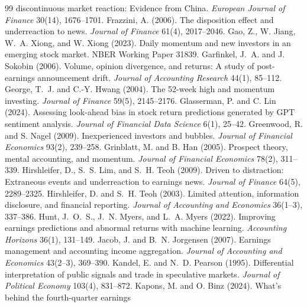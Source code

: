 \documentclass[10pt]{article}
\begin{document}
\begin{thebibliography}{99}
discontinuous market reaction: Evidence from China. \emph{European Journal of Finance} 30(14), 1676--1701.
 Frazzini, A. (2006). The disposition effect and underreaction to news.
\emph{Journal of Finance} 61(4), 2017--2046.
 Gao, Z., W. Jiang, W.~A. Xiong, and W. Xiong (2023). Daily momentum and new
investors in an emerging stock market. NBER Working Paper 31839.
 Garfinkel, J.~A. and J. Sokobin (2006). Volume, opinion
divergence, and returns: A study of post-earnings announcement drift. \emph{Journal of Accounting Research} 44(1),
85--112.
 George, T.~J. and C.-Y. Hwang (2004). The 52-week high and momentum
investing. \emph{Journal of Finance} 59(5), 2145--2176.
 Glasserman, P. and C. Lin (2024). Assessing look-ahead bias in
stock return predictions generated by GPT sentiment analysis. \emph{Journal of Financial Data Science} 6(1), 25--42.
 Greenwood, R. and S. Nagel (2009). Inexperienced investors and
bubbles. \emph{Journal of Financial Economics} 93(2), 239--258.
 Grinblatt, M. and B. Han (2005). Prospect theory, mental accounting,
and momentum. \emph{Journal of Financial Economics} 78(2), 311--339.
 Hirshleifer, D., S.~S. Lim, and S.~H. Teoh (2009). Driven to
distraction: Extraneous events and underreaction to earnings news. \emph{Journal of Finance} 64(5), 2289--2325.
 Hirshleifer, D. and S.~H. Teoh (2003). Limited attention,
information disclosure, and financial reporting. \emph{Journal of Accounting and Economics} 36(1--3), 337--386.
 Hunt, J.~O.~S., J.~N. Myers, and L.~A. Myers (2022). Improving earnings
predictions and abnormal returns with machine learning. \emph{Accounting Horizons} 36(1), 131--149.
 Jacob, J. and B.~N. Jorgensen (2007). Earnings management and
accounting income aggregation. \emph{Journal of Accounting and Economics} 43(2--3), 369--390.
 Kandel, E. and N.~D. Pearson (1995). Differential interpretation of
public signals and trade in speculative markets. \emph{Journal of Political Economy} 103(4), 831--872.
 Kapons, M. and O. Binz (2024). What's behind the fourth-quarter earnings

\end{thebibliography}
\end{document}
